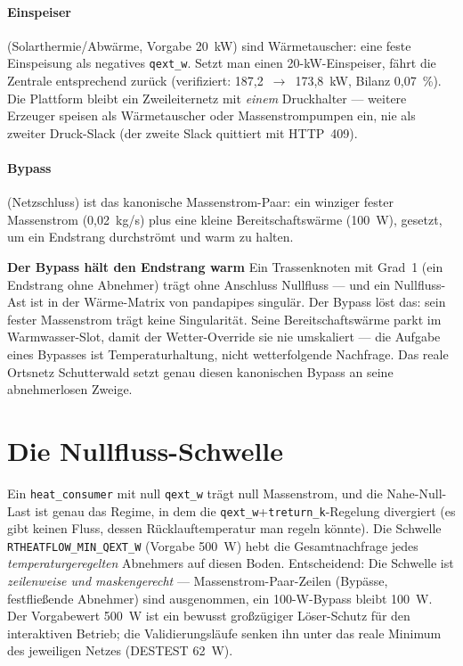 \documentclass[11pt,a4paper,parskip=half]{scrreprt}
\newcommand{\api}[1]{\texttt{#1}}
\newenvironment{beispiel}[1][Beispiel]
  {\par\medskip{\color{bsp}\hrule height 0.8pt}\nopagebreak\smallskip
   \noindent\textbf{\textsf{\textcolor{bsp}{#1}}}\quad\ignorespaces}
  {\par\nopagebreak\smallskip{\color{bsp}\hrule height 0.8pt}\par\medskip}
\begin{document}
\paragraph{Einspeiser} (Solarthermie/Abwärme, Vorgabe 20~kW) sind
Wärmetauscher: eine feste Einspeisung als negatives \texttt{qext\_w}. Setzt man
einen 20-kW-Einspeiser, fährt die Zentrale entsprechend zurück (verifiziert:
187{,}2~$\rightarrow$~173{,}8~kW, Bilanz 0{,}07~\%). Die Plattform bleibt ein
Zweileiternetz mit \emph{einem} Druckhalter --- weitere Erzeuger speisen als
Wärmetauscher oder Massenstrompumpen ein, nie als zweiter Druck-Slack (der
zweite Slack quittiert mit HTTP~409).

\paragraph{Bypass} (Netzschluss) ist das kanonische Massenstrom-Paar: ein
winziger fester Massenstrom (0{,}02~kg/s) plus eine kleine Bereitschaftswärme
(100~W), gesetzt, um ein Endstrang durchströmt und warm zu halten.

\begin{beispiel}[Der Bypass hält den Endstrang warm]
Ein Trassenknoten mit Grad~1 (ein Endstrang ohne Abnehmer) trägt ohne Anschluss
Nullfluss --- und ein Nullfluss-Ast ist in der Wärme-Matrix von pandapipes
singulär. Der Bypass löst das: sein fester Massenstrom trägt keine
Singularität. Seine Bereitschaftswärme parkt im Warmwasser-Slot, damit der
Wetter-Override sie nie umskaliert --- die Aufgabe eines Bypasses ist
Temperaturhaltung, nicht wetterfolgende Nachfrage. Das reale Ortsnetz
Schutterwald setzt genau diesen kanonischen Bypass an seine abnehmerlosen
Zweige.
\end{beispiel}

\section{Die Nullfluss-Schwelle}
\label{sec:nullfluss}

Ein \texttt{heat\_consumer} mit null \texttt{qext\_w} trägt null Massenstrom,
und die Nahe-Null-Last ist genau das Regime, in dem die
\texttt{qext\_w}+\texttt{treturn\_k}-Regelung divergiert (es gibt keinen Fluss,
dessen Rücklauftemperatur man regeln könnte). Die Schwelle
\api{RTHEATFLOW\_MIN\_QEXT\_W} (Vorgabe 500~W) hebt die Gesamtnachfrage jedes
\emph{temperaturgeregelten} Abnehmers auf diesen Boden. Entscheidend: Die
Schwelle ist \emph{zeilenweise und maskengerecht} --- Massenstrom-Paar-Zeilen
(Bypässe, festfließende Abnehmer) sind ausgenommen, ein 100-W-Bypass bleibt
100~W. Der Vorgabewert 500~W ist ein bewusst großzügiger Löser-Schutz für den
interaktiven Betrieb; die Validierungsläufe senken ihn unter das reale Minimum
des jeweiligen Netzes (DESTEST 62~W).
\end{document}
